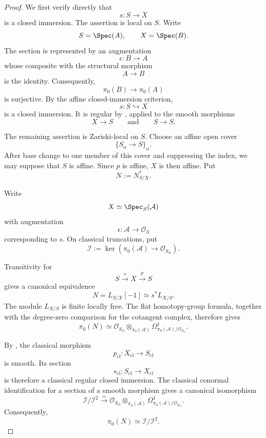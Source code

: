 \begin{proof}
We first verify directly that
\[
    s
    \colon
    S
    \longrightarrow
    X
\]
is a closed immersion. The assertion is local on \(S\). Write
\[
    S=\Spec(A),
    \qquad
    X=\Spec(B).
\]
The section is represented by an augmentation
\[
    \epsilon
    \colon
    B
    \longrightarrow
    A
\]
whose composite with the structural morphism
\[
    A
    \longrightarrow
    B
\]
is the identity. Consequently,
\[
    \pi_0(B)
    \longrightarrow
    \pi_0(A)
\]
is surjective. By the affine closed-immersion criterion,
\[
    s
    \colon
    S
    \hookrightarrow
    X
\]
is a closed immersion. It is regular by
, applied to the smooth
morphisms
\[
    X\longrightarrow S
    \qquad\text{and}\qquad
    S\longrightarrow S.
\]

The remaining assertion is Zariski-local on \(S\). Choose an affine open
cover
\[
    \{S_\alpha\to S\}_\alpha.
\]
After base change to one member of this cover and suppressing the index,
we may suppose that \(S\) is affine. Since \(p\) is affine, \(X\) is
then affine. Put
\[
    N
    :=
    N^*_{S/X}.
\]

Write
\[
    X
    \simeq
    \Spec_S(\mathcal A)
\]
with augmentation
\[
    \epsilon
    \colon
    \mathcal A
    \longrightarrow
    \mathcal O_S
\]
corresponding to \(s\). On classical truncations, put
\[
    \mathcal I
    :=
    \ker
    \left(
        \pi_0(\mathcal A)
        \longrightarrow
        \mathcal O_{S_{\mathrm{cl}}}
    \right).
\]

Transitivity for
\[
    S
    \xrightarrow{s}
    X
    \xrightarrow{p}
    S
\]
gives a canonical equivalence
\[
    N
    =
    L_{S/X}[-1]
    \simeq
    s^*L_{X/S}.
\]
The module \(L_{X/S}\) is finite locally free. The flat
homotopy-group formula, together with the degree-zero comparison for the
cotangent complex, therefore gives
\[
    \pi_0(N)
    \simeq
    \mathcal O_{S_{\mathrm{cl}}}
    \otimes_{\pi_0(\mathcal A)}
    \Omega^1_{\pi_0(\mathcal A)/
    \mathcal O_{S_{\mathrm{cl}}}}.
\]

By
, the classical morphism
\[
    p_{\mathrm{cl}}
    \colon
    X_{\mathrm{cl}}
    \longrightarrow
    S_{\mathrm{cl}}
\]
is smooth. Its section
\[
    s_{\mathrm{cl}}
    \colon
    S_{\mathrm{cl}}
    \longrightarrow
    X_{\mathrm{cl}}
\]
is therefore a classical regular closed immersion. The classical
conormal identification for a section of a smooth morphism gives a
canonical isomorphism
\[
    \mathcal I/\mathcal I^2
    \xrightarrow{\simeq}
    \mathcal O_{S_{\mathrm{cl}}}
    \otimes_{\pi_0(\mathcal A)}
    \Omega^1_{\pi_0(\mathcal A)/
    \mathcal O_{S_{\mathrm{cl}}}}.
\]
Consequently,
\[
    \pi_0(N)
    \simeq
    \mathcal I/\mathcal I^2.
\]


\end{proof}
